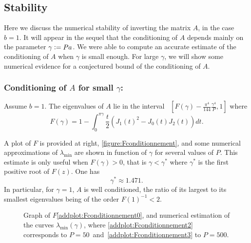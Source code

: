\documentclass[11pt,a4paper]{article}
\begin{document}
\subsection{Stability}
\newcommand{\Pa}{\gamma}
\newcommand{\Pastar}{\Pa^*}
Here we discuss the numerical stability of inverting the matrix $A$, in the case $b=1$. It will appear in the sequel that the conditioning of $A$ depends mainly on the parameter $\Pa \isdef Pa$. We were able to compute an accurate estimate of the conditioning of $A$ when $\Pa$ is small enough. For large $\Pa$, we will show some numerical evidence for a conjectured bound of the conditioning of $A$.   
\vspace{0.3cm}
\noindent \begin{minipage}{0.5\textwidth}
\subsubsection*{Conditioning of $A$ for small $\Pa$:}
\begin{The} Assume $b=1$. The eigenvalues of $A$ lie in the interval~ ${[F(\Pa) - \frac{\pi^4}{144}\frac{\gamma^4}{P},1]}$ where
	\[F(\Pa) = 1 - \int_{0}^{\pi \gamma} \frac{t}{2}(J_1(t)^2 - J_0(t)J_2(t) )dt.\]
\end{The}
A plot of $F$ is provided at right, \autoref{figure:Fconditionnement}, and some numerical approximations of $\lambda_{\min}$ are shown in function of $\Pa$ for several values of $P$. 			
This estimate is only useful when ${F(\Pa) > 0}$, that is ${\Pa < \Pastar}$ where $\Pastar$ is the first positive root of $F(z)$. One has 
\[\Pastar \approx 1.471.\]
In particular, for $\gamma = 1$, $A$ is well conditioned, the ratio of its largest to its smallest eigenvalues being of the order $F(1)^{-1} < 2$. 
\end{minipage}%
%
\begin{minipage}{0.5\textwidth}
	\begin{figure}[H]
		\centering			
		
		\captionsetup{width=0.7\textwidth}
		\caption{Graph of $F$\ref{addplot:Fconditionnement0}, and numerical estimation of the curves $\lambda_{\min}(\Pa)$, where \ref{addplot:Fconditionnement2} corresponds to ${P=50}$~and~\ref{addplot:Fconditionnement3} to ${P=500}$. }
		\label{figure:Fconditionnement}
	\end{figure}
\end{minipage}
\end{document}

